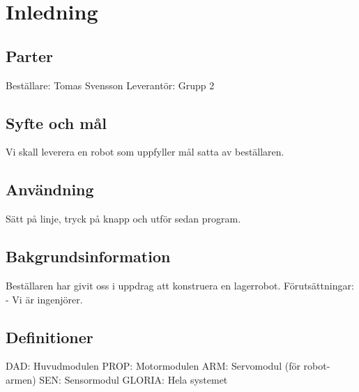 \section{Inledning}

\subsection{Parter}
Beställare: Tomas Svensson
Leverantör: Grupp 2

\subsection{Syfte och mål}
Vi skall leverera en robot som uppfyller mål satta av beställaren. 

\subsection{Användning}
Sätt på linje, tryck på knapp och utför sedan program.

\subsection{Bakgrundsinformation}
Beställaren har givit oss i uppdrag att konstruera en lagerrobot. Förutsättningar:
- Vi är ingenjörer.

\subsection{Definitioner}
DAD: Huvudmodulen
PROP: Motormodulen
ARM: Servomodul (för robot-armen)
SEN: Sensormodul
GLORIA: Hela systemet